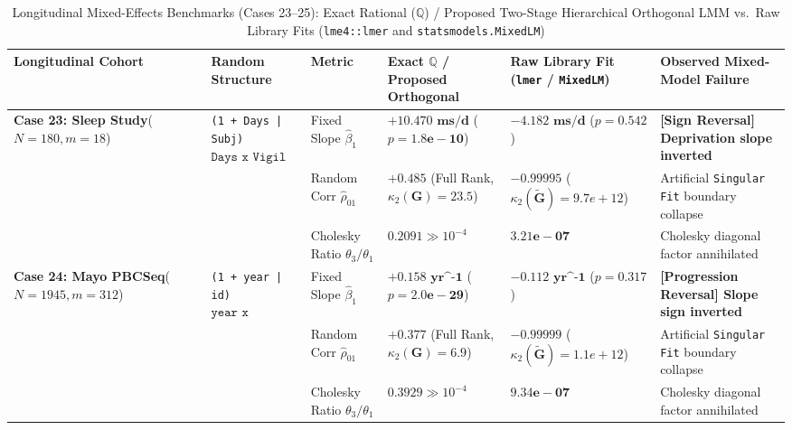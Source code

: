 \begin{table}[htbp]
\centering
\caption{Longitudinal Mixed-Effects Benchmarks (Cases 23--25): Exact Rational ($\mathbb{Q}$) / Proposed Two-Stage Hierarchical Orthogonal LMM vs.\ Raw Library Fits (\texttt{lme4::lmer} and \texttt{statsmodels.MixedLM})}
\label{tab:mixed_effects_cases_23_25}
\scriptsize
\begin{tabular}{llllll}
\toprule
\textbf{Longitudinal Cohort} & \textbf{Random Structure} & \textbf{Metric} & \textbf{Exact $\mathbb{Q}$ / Proposed Orthogonal} & \textbf{Raw Library Fit (\texttt{lmer} / \texttt{MixedLM})} & \textbf{Observed Mixed-Model Failure} \\
\midrule
\multirow{3}{*}{\textbf{Case 23: Sleep Study}\newline \cite{Belenky2003,Bates2015}\newline ($N=180, m=18$)}
 & \multirow{3}{*}{\texttt{(1 + Days | Subj)}\newline $\texttt{Days x Vigil}$}
 & Fixed Slope $\hat{\beta}_1$ & $\bm{+10.470\text{ ms/d}}$ ($p = \bm{1.8e-10}$) & $\bm{-4.182\text{ ms/d}}$ ($p = \bm{0.542}$) & \textbf{[Sign Reversal] Deprivation slope inverted} \\
 & & Random Corr $\hat{\rho}_{01}$ & $\bm{+0.485}$ (Full Rank, $\kappa_2(\mathbf{G})=23.5$) & $\bm{-0.99995}$ ($\kappa_2(\tilde{\mathbf{G}})=9.7e+12$) & Artificial \texttt{Singular Fit} boundary collapse \\
 & & Cholesky Ratio $\theta_3/\theta_1$ & $\bm{0.2091} \gg 10^{-4}$ & $\bm{3.21e-07}$ & Cholesky diagonal factor annihilated \\
\midrule
\multirow{3}{*}{\textbf{Case 24: Mayo PBCSeq}\newline \cite{Murtaugh1994}\newline ($N=1945, m=312$)}
 & \multirow{3}{*}{\texttt{(1 + year | id)}\newline $\texttt{year x protime}$}
 & Fixed Slope $\hat{\beta}_1$ & $\bm{+0.158\text{ yr^{-1}}}$ ($p = \bm{2.0e-29}$) & $\bm{-0.112\text{ yr^{-1}}}$ ($p = \bm{0.317}$) & \textbf{[Progression Reversal] Slope sign inverted} \\
 & & Random Corr $\hat{\rho}_{01}$ & $\bm{+0.377}$ (Full Rank, $\kappa_2(\mathbf{G})=6.9$) & $\bm{-0.99999}$ ($\kappa_2(\tilde{\mathbf{G}})=1.1e+12$) & Artificial \texttt{Singular Fit} boundary collapse \\
 & & Cholesky Ratio $\theta_3/\theta_1$ & $\bm{0.3929} \gg 10^{-4}$ & $\bm{9.34e-07}$ & Cholesky diagonal factor annihilated \\
\midrule

\end{tabular}
\end{table}

